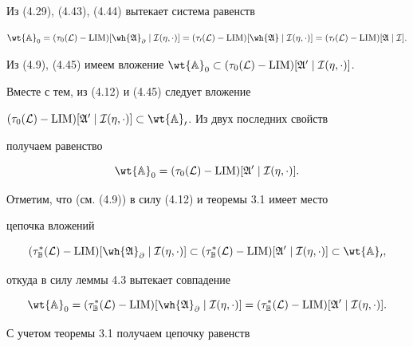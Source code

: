 Из (4.29), (4.43), (4.44) вытекает система равенств


\begin{equation}


\wt{\Bbb A}_0=(\tau_0(\cal L)-


\LIM)[\wh{\frak A}_\partial\mid\cal I(\eta,\cdot)]=


(\tau_0(\cal L)-\LIM)[\wh{\frak A}\mid\cal I(\eta,\cdot)]=


(\tau_0(\cal L)-\LIM)[\frak A\mid\cal I].


\end{equation}


Из (4.9), (4.45) имеем вложение $\wt{\Bbb A}_0\subset


(\tau_0(\cal L)-\LIM)[\frak A^0\mid\cal I(\eta,\cdot)]$.


Вместе с тем, из (4.12) и (4.45) следует вложение


$(\tau_0(\cal L)-\LIM)[\frak A^0\mid\cal I(\eta,


\cdot)]\subset\wt{\Bbb A}_0$. Из двух последних свойств


получаем равенство


\begin{equation}


\wt{\Bbb A}_0=(\tau_0(\cal L)-\LIM)[\frak A^0\mid


\cal I(\eta,\cdot)].


\end{equation}


Отметим, что (см. (4.9)) в силу (4.12) и теоремы 3.1 имеет место


цепочка вложений


$$


(\tau^*_{\Bbb B}(\cal L)-\LIM)[\wh{\frak A}_\partial


\mid\cal I(\eta,\cdot)]\subset


(\tau^*_{\Bbb B}(\cal L)-\LIM)[\frak A^0\mid


\cal I(\eta,\cdot)]\subset\wt{\Bbb A}_0,


$$


откуда в силу леммы 4.3 вытекает совпадение


$$


\wt{\Bbb A}_0=(\tau^*_{\Bbb B}(\cal L)-


\LIM)[\wh{\frak A}_\partial\mid\cal I(\eta,\cdot)]=


(\tau^*_{\Bbb B}(\cal L)-\LIM)[\frak A^0\mid\cal I(\eta,\cdot)].


$$


С учетом теоремы 3.1 получаем цепочку равенств


